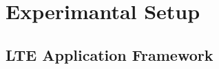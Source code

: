 \chapter{Experimantal Setup}
\label{ch:ExSetup}

\section{LTE Application Framework}\label{sec:LTEAFW}




